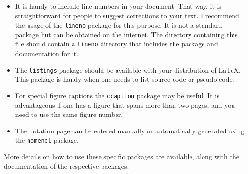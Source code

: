 \begin{itemize}  
	\item It is handy to include line numbers in your document. That way, it is straightforward for people to suggest corrections to your text. I recommend the usage of the \texttt{lineno} package for this purpose. It is not a standard package but can be obtained on the internet. The directory containing this file should contain a \verb|lineno| directory that includes the package and documentation for it.
	
	\item The \texttt{listings} package should be available with your
	distribution of \LaTeX.  This package is handy when one needs to list source code or pseudo-code.
	
	\item For special figure captions the \texttt{ccaption} package may be useful.  It is advantageous if one has a figure that spans more than two pages, and you need to use the same figure number.
	
	\item The notation page can be entered manually or automatically generated using the \texttt{nomencl} package.
	
\end{itemize}

More details on how to use these specific packages are available, along with the documentation of the respective packages.
